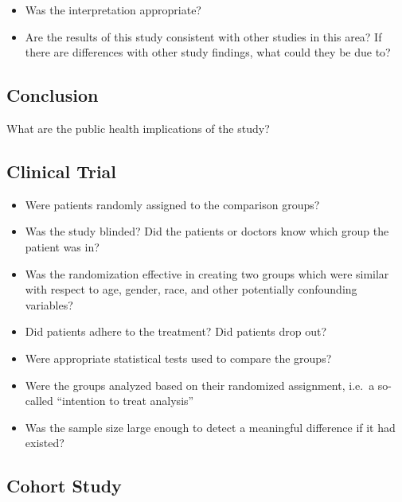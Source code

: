 \documentclass[]{book}
\providecommand{\tightlist}{%
  \setlength{\itemsep}{0pt}\setlength{\parskip}{0pt}}
\begin{document}
\begin{itemize}
\tightlist
\item
  Was the interpretation appropriate?
\item
  Are the results of this study consistent with other studies in this area? If there are differences with other study findings, what could they be due to?
\end{itemize}

\hypertarget{conclusion}{%
\subsection{Conclusion}\label{conclusion}}

What are the public health implications of the study?

\hypertarget{clinical-trial}{%
\subsection{Clinical Trial}\label{clinical-trial}}

\begin{itemize}
\tightlist
\item
  Were patients randomly assigned to the comparison groups?
\item
  Was the study blinded? Did the patients or doctors know which group the patient was in?
\item
  Was the randomization effective in creating two groups which were similar with respect to age, gender, race, and other potentially confounding variables?
\item
  Did patients adhere to the treatment? Did patients drop out?
\item
  Were appropriate statistical tests used to compare the groups?
\item
  Were the groups analyzed based on their randomized assignment, i.e.~a so-called ``intention to treat analysis''
\item
  Was the sample size large enough to detect a meaningful difference if it had existed?
\end{itemize}

\hypertarget{cohort-study}{%
\subsection{Cohort Study}\label{cohort-study}}
\end{document}
